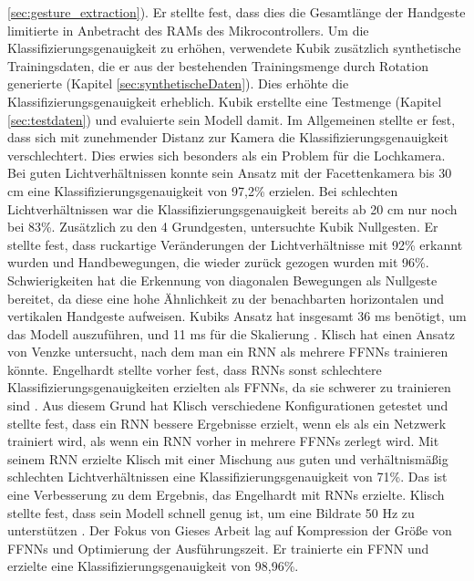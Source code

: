 \ref{sec:gesture_extraction}). Er stellte fest, dass dies die Gesamtlänge der Handgeste limitierte in Anbetracht des RAMs des Mikrocontrollers. Um die Klassifizierungsgenauigkeit zu erhöhen, verwendete Kubik zusätzlich
synthetische Trainingsdaten, die er aus der bestehenden Trainingsmenge durch Rotation generierte (Kapitel \ref{sec:synthetischeDaten}). Dies erhöhte die Klassifizierungsgenauigkeit erheblich. Kubik erstellte eine Testmenge
(Kapitel \ref{sec:testdaten}) und evaluierte sein Modell damit. Im Allgemeinen stellte er fest, dass sich mit zunehmender Distanz zur Kamera die Klassifizierungsgenauigkeit verschlechtert. Dies erwies sich besonders als ein
Problem für die Lochkamera. Bei guten Lichtverhältnissen konnte sein Ansatz mit der Facettenkamera bis 30 cm eine Klassifizierungsgenauigkeit von 97,2\% erzielen. Bei schlechten Lichtverhältnissen war die Klassifizierungsgenauigkeit
bereits ab 20 cm nur noch bei 83\%. Zusätzlich zu den 4 Grundgesten, untersuchte Kubik Nullgesten. Er stellte fest, dass ruckartige Veränderungen der Lichtverhältnisse mit 92\% erkannt wurden und Handbewegungen, die wieder
zurück gezogen wurden mit 96\%. Schwierigkeiten hat die Erkennung von diagonalen Bewegungen als Nullgeste bereitet, da diese eine hohe Ähnlichkeit zu der benachbarten horizontalen und vertikalen Handgeste aufweisen. Kubiks Ansatz
hat insgesamt 36 ms benötigt, um das Modell auszuführen, und 11 ms für die Skalierung \cite{kubikThesis}.
\newline
\newline
Klisch hat einen Ansatz von Venzke untersucht, nach dem man ein RNN als mehrere FFNNs trainieren könnte. Engelhardt stellte vorher fest, dass RNNs sonst schlechtere
Klassifizierungsgenauigkeiten erzielten als FFNNs, da sie schwerer zu trainieren sind \cite{engelhardtThesis}. Aus diesem Grund hat Klisch verschiedene Konfigurationen getestet und stellte fest,
dass ein RNN bessere Ergebnisse erzielt, wenn els als ein Netzwerk trainiert wird, als wenn ein RNN vorher in mehrere FFNNs zerlegt wird. Mit seinem RNN erzielte Klisch mit einer Mischung aus guten und
verhältnismäßig schlechten Lichtverhältnissen eine Klassifizierungsgenauigkeit von 71\%. Das ist eine Verbesserung zu dem Ergebnis, das Engelhardt mit RNNs erzielte.
Klisch stellte fest, dass sein Modell schnell genug ist, um eine Bildrate 50 Hz zu unterstützen \cite{klischThesis}.
\newline
\newline
Der Fokus von Gieses Arbeit lag auf Kompression der Größe von FFNNs und Optimierung der Ausführungszeit. Er trainierte ein FFNN und erzielte eine Klassifizierungsgenauigkeit von 98,96\%.
